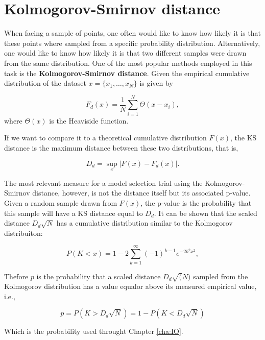 \section{Kolmogorov-Smirnov distance}

When facing a sample of points, one often would like to know how likely it is that these points where sampled from a specific probability distribution. Alternatively, one would like to know how likely it is that two different samples were drawn from the same distribution. One of the most popular methods employed in this task is the
\textbf{Kolmogorov-Smirnov distance}. Given the empirical cumulative distribution of the dataset $x = \{x_1, \ldots, x_N\}$ is given by

\begin{equation}
F_d (x) = \frac{1}{N} \sum_{i=1}^N \Theta(x - x_i),
\end{equation}
where $\Theta(x)$ is the Heaviside function.

If we want to compare it to a theoretical
cumulative distribution $F(x)$, the KS distance is the maximum
distance between these two distributions, that is,

\begin{equation}
  \label{eq:9}
  D_d = \sup_x |F(x) - F_d(x)|.
\end{equation}

The most relevant measure for a model selection trial using the
Kolmogorov-Smirnov distance, however, is not the distance itself but its associated p-value. Given a random sample drawn from $F(x)$, the p-value is the probability that this sample will have a KS distance equal to $D_d$. It can be shown that the scaled distance $D_d \sqrt{N}$ has a cumulative distribution similar to the Kolmogorov distribuiton:

\begin{equation}
  \label{eq:1}
  P(K < x) = 1 - 2 \sum_{k=1}^\infty (-1)^{k-1}e^{-2k^2 x^2},
\end{equation}

Thefore $p$ is the probability that a scaled distance $D_d \sqrt(N)$ sampled from the Kolmogorov distribution has a value equalor above its measured empirical value, i.e.,

\begin{equation}
   p = P(K > D_d\sqrt{N}) = 1 - P(K< D_d \sqrt{N}) 
\end{equation}

Which is the probability used throught Chapter \ref{cha:IO}.

